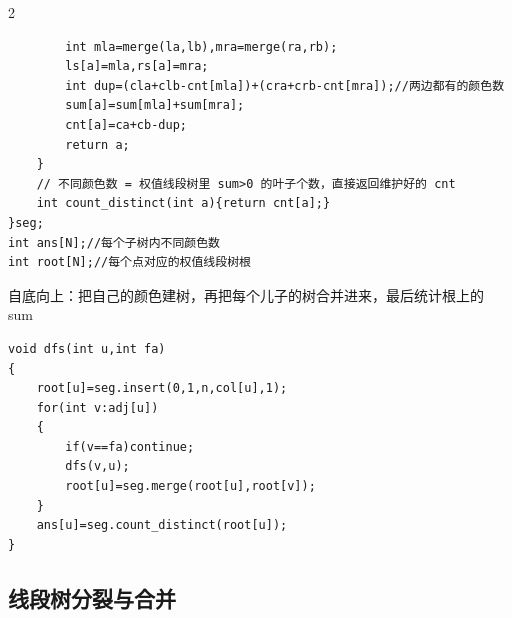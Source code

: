 \documentclass[UTF8,fontset=fandol,a4paper,twoside]{ctexart}
\newcommand{\note}[1]{{\fontsize{10}{12}\selectfont #1\par}}
\begin{document}
\begin{multicols}{2}
\begin{lstlisting}
        int mla=merge(la,lb),mra=merge(ra,rb);
        ls[a]=mla,rs[a]=mra;
        int dup=(cla+clb-cnt[mla])+(cra+crb-cnt[mra]);//两边都有的颜色数
        sum[a]=sum[mla]+sum[mra];
        cnt[a]=ca+cb-dup;
        return a;
    }
    // 不同颜色数 = 权值线段树里 sum>0 的叶子个数，直接返回维护好的 cnt
    int count_distinct(int a){return cnt[a];}
}seg;
int ans[N];//每个子树内不同颜色数
int root[N];//每个点对应的权值线段树根
\end{lstlisting}
\note{自底向上：把自己的颜色建树，再把每个儿子的树合并进来，最后统计根上的 sum}
\begin{lstlisting}
void dfs(int u,int fa)
{
    root[u]=seg.insert(0,1,n,col[u],1);
    for(int v:adj[u])
    {
        if(v==fa)continue;
        dfs(v,u);
        root[u]=seg.merge(root[u],root[v]);
    }
    ans[u]=seg.count_distinct(root[u]);
}
\end{lstlisting}
\subsection{线段树分裂与合并}


\end{multicols}
\end{document}
